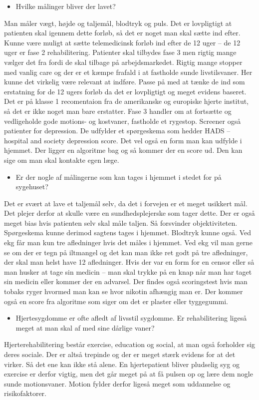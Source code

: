 \begin{itemize}
	\item Hvilke målinger bliver der lavet?
\end{itemize} 
Man måler vægt, højde og taljemål, blodtryk og puls. Det er lovpligtigt at patienten skal igennem dette forløb, så det er noget man skal sætte ind efter. Kunne være muligt at sætte telemedicinsk forløb ind efter de 12 uger – de 12 uger er fase 2 rehabilitering. Patienter skal tilbydes fase 3 men rigtig mange vælger det fra fordi de skal tilbage på arbejdsmarkedet. Rigtig mange stopper med vanlig care og der er et kæmpe frafald i at fastholde sunde livstilsvaner. Her kunne det virkelig være relevant at indføre. Passe på med at tænke de ind som erstatning for de 12 ugers forløb da det er lovpligtigt og meget evidens baseret. Det er på klasse 1 recomentaion fra de amerikanske og europiske hjerte institut, så det er ikke noget man bare erstatter. Fase 3 handler om at fortsætte og vedligeholde gode motions- og kostvaner, fastholde et rygestop. Screener også patienter for depression. De udfylder et spørgeskema som hedder HADS – hospital and society depression score. Det vel også en form man kan udfylde i hjemmet. Der ligger en algoritme bag og så kommer der en score ud. Den kan sige om man skal kontakte egen læge. 

\begin{itemize}
	\item Er der nogle af målingerne som kan tages i hjemmet i stedet for på sygehuset?
\end{itemize} 
Det er svært at lave et taljemål selv, da det i forvejen er et meget usikkert mål. Det plejer derfor at skulle være en sundhedsplejerske som tager dette. Der er også meget bias hvis patienten selv skal måle taljen. Så forsvinder objektiviteten. Spørgeskema kunne derimod sagtens tages i hjemmet. Blodtryk kunne også. Ved ekg får man kun tre afledninger hvis det måles i hjemmet. Ved ekg vil man gerne se om der er tegn på iltmangel og det kan man ikke ret godt på tre afledninger, der skal man helst have 12 afledninger. Hvis der var en form for en censor eller så man husker at tage sin medicin – man skal trykke på en knap når man har taget sin medicin eller kommer der en advarsel. Der findes også scoringstest hvis man tobaks ryger hvormed man kan se hvor nikotin afhængig man er. Der kommer også en score fra algoritme som siger om det er plaster eller tyggegummi. 

\begin{itemize}
	\item Hjertesygdomme er ofte afledt af livsstil sygdomme. Er rehabilitering ligeså meget at man skal af med sine dårlige vaner? 
\end{itemize} 
Hjerterehabilitering består exercise, education og social, at man også forholder sig deres sociale. Der er altså trepinde og der er meget stærk evidens for at det virker. Så det ene kan ikke stå alene. En hjertepatient bliver pludselig syg og exercise er derfor vigtig, men det går meget på at få pulsen op og lære dem nogle sunde motionsvaner. Motion fylder derfor ligeså meget som uddannelse og risikofaktorer. 

